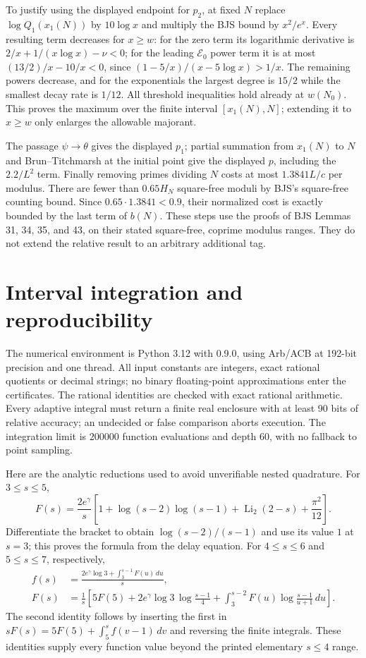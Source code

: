 \documentclass[11pt]{article}
\theoremstyle{definition}
\newcommand{\cert}[1]{\texttt{\detokenize{#1}}}
\begin{document}
To justify using the displayed endpoint for $p_2$, at fixed $N$ replace
$\log Q_1(x_1(N))$ by $10\log x$ and multiply the BJS bound by
$x^2/e^x$.  Every resulting term decreases for $x\ge w$:
for the zero term its logarithmic derivative is
$2/x+1/(x\log x)-\nu<0$;
for the leading $\mathcal E_0$ power term it is at most
$(13/2)/x-10/x<0$, since
$(1-5/x)/(x-5\log x)>1/x$.
The remaining powers decrease, and for the exponentials the largest
degree is $15/2$ while the smallest decay rate is $1/12$.
All threshold inequalities hold already at $w(N_0)$.
This proves the maximum over the finite interval $[x_1(N),N]$;
extending it to $x\ge w$ only enlarges the allowable majorant.

The passage $\psi\to\theta$ gives the displayed $p_1$; partial summation
from $x_1(N)$ to $N$ and Brun--Titchmarsh at the initial point give
the displayed $p$, including the $2.2/L^2$ term.
Finally removing primes dividing $N$ costs at most
$1.3841L/c$ per modulus.  There are fewer than
$0.65H_N$ square-free moduli by BJS's square-free counting bound.
Since $0.65\cdot1.3841<0.9$, their normalized cost is exactly bounded
by the last term of $b(N)$.
These steps use the proofs of BJS Lemmas 31, 34, 35, and 43, on their
stated square-free, coprime modulus ranges.  They do not extend the
relative result to an arbitrary additional tag.

\section{Interval integration and reproducibility}\label{sec:certificate}

The numerical environment is Python 3.12 with \cert{python-flint}
0.9.0, using Arb/ACB at 192-bit precision and one thread.
All input constants are integers, exact rational quotients or decimal
strings; no binary floating-point approximations enter the certificates.
The rational identities are checked with exact rational arithmetic.
Every adaptive integral must return a finite real enclosure with at
least 90 bits of relative accuracy; an undecided or false comparison
aborts execution.  The integration limit is $200000$ function
evaluations and depth $60$, with no fallback to point sampling.

Here are the analytic reductions used to avoid unverifiable nested
quadrature.  For $3\le s\le5$,
\[
 F(s)=\frac{2e^\gamma}{s}
 \left[1+\log(s-2)\log(s-1)+\operatorname{Li}_2(2-s)
                                      +\frac{\pi^2}{12}\right].
\]
Differentiate the bracket to obtain $\log(s-2)/(s-1)$ and use
its value $1$ at $s=3$; this proves the formula from the delay equation.
For $4\le s\le6$ and $5\le s\le7$, respectively,
\begin{align*}
 f(s)&=\frac{2e^\gamma\log3+\int_3^{s-1}F(u)\,du}{s},\\
 F(s)&=\frac1s\left[
 5F(5)+2e^\gamma\log3\,\log\frac{s-1}{4}
 +\int_3^{s-2}F(u)\log\frac{s-1}{u+1}\,du\right].
\end{align*}
The second identity follows by inserting the first in
$sF(s)=5F(5)+\int_5^sf(v-1)\,dv$ and reversing the finite integrals.
These identities supply every function value beyond the printed
elementary $s\le4$ range.
\end{document}
